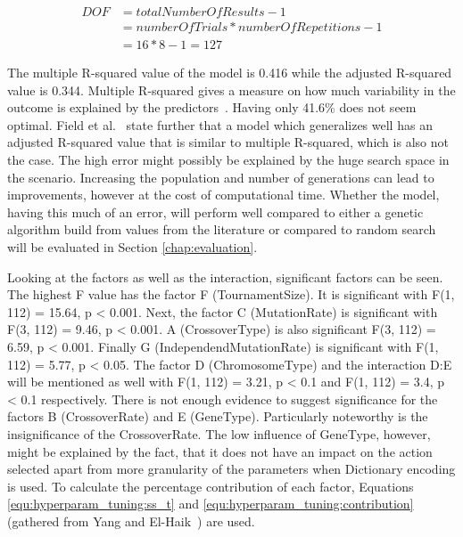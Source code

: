 \begin{equation}
	\begin{split}
		DOF & = totalNumberOfResults - 1 \\
		& = numberOfTrials * numberOfRepetitions - 1 \\
		& = 16 * 8 - 1 = 127
	\end{split}
	\label{equ:hyperparam_tuning:full_DOF}
\end{equation}

The multiple R-squared value of the model is 0.416 while the adjusted R-squared value is 0.344. Multiple R-squared gives a measure on how much variability in the outcome is explained by the predictors~\cite{field_discovering_2012}. Having only 41.6\% does not seem optimal. Field et al.~\cite{field_discovering_2012} state further that a model which generalizes well has an adjusted R-squared value that is similar to multiple R-squared, which is also not the case. The high error might possibly be explained by the huge search space in the scenario. Increasing the population and number of generations can lead to improvements, however at the cost of computational time. Whether the model, having this much of an error, will perform well compared to either a genetic algorithm build from values from the literature or compared to random search will be evaluated in Section \ref{chap:evaluation}.

Looking at the factors as well as the interaction, significant factors can be seen. The highest F value has the factor F (TournamentSize). It is significant with F(1, 112) = 15.64, p < 0.001. Next, the factor C (MutationRate) is significant with F(3, 112) = 9.46, p < 0.001. A (CrossoverType) is also significant F(3, 112) = 6.59, p < 0.001. Finally G (IndependendMutationRate) is significant with F(1, 112) = 5.77, p < 0.05. The factor D (ChromosomeType) and the interaction D:E will be mentioned as well with F(1, 112) = 3.21, p < 0.1 and F(1, 112) = 3.4, p < 0.1 respectively. There is not enough evidence to suggest significance for the factors B (CrossoverRate) and E (GeneType). Particularly noteworthy is the insignificance of the CrossoverRate. The low influence of GeneType, however, might be explained by the fact, that it does not have an impact on the action selected apart from more granularity of the parameters when Dictionary encoding is used. To calculate the percentage contribution of each factor, Equations \ref{equ:hyperparam_tuning:ss_t} and \ref{equ:hyperparam_tuning:contribution} (gathered from Yang and El-Haik~\cite{yang_design_2009}) are used.

